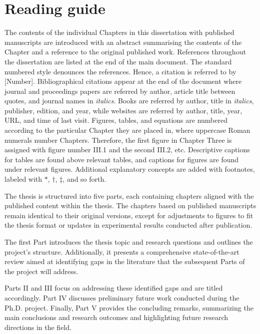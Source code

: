 \section*{Reading guide}
The contents of the individual Chapters in this dissertation with published manuscripts are introduced with an abstract summarising the contents of the Chapter and a reference to the original published work. References throughout the dissertation are listed at the end of the main document. The standard numbered style denounces the references. Hence, a citation is referred to by [Number]. Bibliographical citations appear at the end of the document where journal and proceedings papers are referred by author, article title between quotes, and journal names in \textit{italics}. Books are referred by author, title in \textit{italics}, publisher, edition, and year, while websites are referred by author, title, year, URL, and time of last visit. Figures, tables, and equations are numbered according to the particular Chapter they are placed in, where uppercase Roman numerals number Chapters. Therefore, the first figure in Chapter Three is assigned with figure number III.1 and the second III.2, etc. Descriptive captions for tables are found above relevant tables, and captions for figures are found under relevant figures. Additional explanatory concepts are added with footnotes, labeled with $\ast$, $\dagger$, $\ddagger$, and so forth.

The thesis is structured into five parts, each containing chapters aligned with the published content within the thesis. The chapters based on published manuscripts remain identical to their original versions, except for adjustments to figures to fit the thesis format or updates in experimental results conducted after publication.

The first Part introduces the thesis topic and research questions and outlines the project's structure. Additionally, it presents a comprehensive state-of-the-art review aimed at identifying gaps in the literature that the subsequent Parts of the project will address.

Parts II and III focus on addressing these identified gaps and are titled accordingly. Part IV discusses preliminary future work conducted during the Ph.D. project. Finally, Part V provides the concluding remarks, summarizing the main conclusions and research outcomes and highlighting future research directions in the field.




